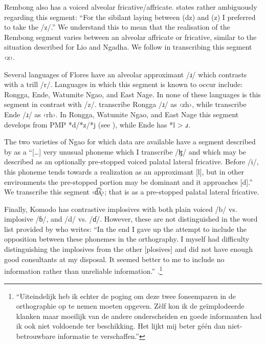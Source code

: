 Rembong also has a voiced alveolar fricative/affricate.
\citet[vi]{Verheijen1977} states rather ambiguously regarding this
segment: “For the sibilant laying between (dz)
and (z) I preferred to take the /z/.” We understand this to mean
that the realisation of the Rembong segment varies between an
alveolar affricate or fricative,
similar to the situation described for Lio and Ngadha.
We follow \citet{Verheijen1977} in transcribing this segment ‹z›.

Several languages of Flores have an alveolar approximant /ɹ/
which contrasts with a trill /r/.
Languages in which this segment is known to occur include: Rongga,
Ende, Watumite Nga{\Q}o, and East Nage.
In none of these languages is this segment in contrast with /z/.
\citet{ArkaEtAl2007} transcribe Rongga /ɹ/ as ‹zh›, while \citet{AokiNakagawa1993}
transcribe Ende /ɹ/ as ‹rh›.
In Rongga, Watumite Nga{\Q}o,
and East Nage this segment develops from PMP *d/*z/*j (see ),
while Ende has *l > \it{ɹ}.

The two varieties of Nga{\Q}o for which data are available have
a segment described by \citet[78]{Elias2018} as a “[{\ldots}]
very unusual phoneme which I transcribe /ɮ/
and which may be described as an optionally pre-stopped voiced palatal lateral fricative.
Before /i/, this phoneme tends towards a realization as an approximant
[l], but in other environments the pre-stopped portion may be dominant
and it approaches [d].” We transcribe this segment ‹d͡ʎ̝›;
that is as a pre-stopped palatal lateral fricative.

Finally, Komodo has contrastive implosives with both plain
voiced /b/ vs. implosive /ɓ/, and /d/ vs. /ɗ/.
However, these are not distinguished in the word list provided
by \citet{Verheijen1987} who writes: “In the end I gave up the
attempt to include the opposition between these phonemes in the orthography.
I myself had difficulty distinguishing the implosives from the
other [plosives] and did not have enough good consultants at my disposal.
It seemed better to me to include no information rather than
unreliable information.” \citep[27]{Verheijen1982}.\footnote{
		“Uiteindelijk heb ik echter de poging om deze twee foneemparen in de orthographie
		op te nemen moeten opgeven.
		Zèlf kon ik de geïmplodeerde klanken maar moeilijk van de andere
		onderscheiden en goede informanten had ik ook niet voldoende ter beschikking.
		Het lijkt mij beter géén dan niet-betrouwbare informatie te verschaffen.”}